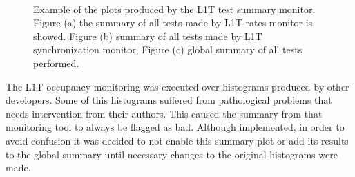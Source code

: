 \begin{figure}[!htp]%
\centering
{}\qquad
{}\\
\caption[Example of the plots produced by the \gls{L1T} test summary monitor]{Example of the plots produced by the \gls{L1T} test summary monitor. Figure (a) the summary of all tests made by \gls{L1T} rates monitor is showed. Figure (b) summary of all tests made by \gls{L1T} synchronization monitor, Figure (c) global summary of all tests performed.}
\label{FIGURE:TechnicalWork_TestsSummary}
\end{figure}

The \gls{L1T} occupancy monitoring was executed over histograms produced by other developers. Some of this histograms suffered from pathological problems that needs intervention from their authors. This caused the summary from that monitoring tool to always be flagged as bad. Although implemented, in order to avoid confusion it was decided to not enable this summary plot or add its results to the global summary until necessary changes to the original histograms were made.



